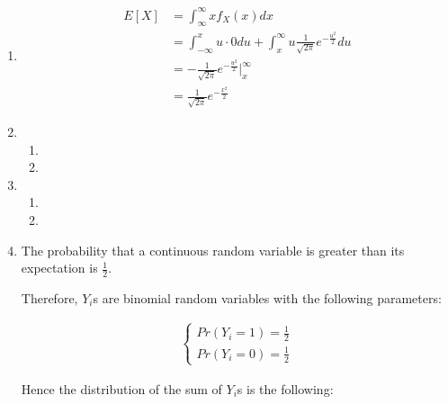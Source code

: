 \documentclass[11pt,letterpaper,titlepage]{article}
\begin{document}
\begin{enumerate}
    \item %
    
    \begin{equation*}
        \begin{aligned}
            E[X] &= \int_{\infty}^{\infty} x f_X(x) dx \\
            &= \int_{-\infty}^{x} u \cdot 0 du + \int_{x}^{\infty} u \frac{1}{\sqrt{2\pi}} e^{-\frac{u^2}{2}} du \\
            &= -\frac{1}{\sqrt{2\pi}} e^{-\frac{u^2}{2}} |_{x}^{\infty} \\
            &= \frac{1}{\sqrt{2\pi}} e^{-\frac{x^2}{2}}
        \end{aligned}
    \end{equation*}
    
    \item %
    
    \begin{enumerate}
        \item 
        
        \item
        
    \end{enumerate}
    
    \item %
    
    \begin{enumerate}
        \item 
        
        \item
        
    \end{enumerate}
    
    \item %
    
    The probability that a continuous random variable is greater than its expectation is $\frac{1}{2}$.
    
    Therefore, $Y_i$s are binomial random variables with the following parameters:
    
    \begin{gather*}
        \begin{cases}
        Pr(Y_i = 1) = \frac{1}{2} \\
        Pr(Y_i = 0) = \frac{1}{2}
        \end{cases}
    \end{gather*}

    Hence the distribution of the sum of $Y_i$s is the following:
    

\end{enumerate}
\end{document}
